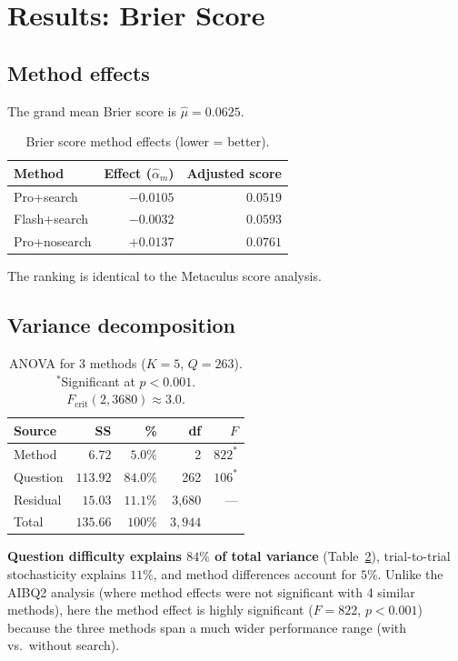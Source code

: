 \documentclass[11pt]{article}
\begin{document}
\section{Results: Brier Score}

\subsection{Method effects}

The grand mean Brier score is $\hat{\mu} = 0.0625$.

\begin{table}[h]
\centering
\begin{tabular}{lrr}
\toprule
Method & Effect ($\hat{\alpha}_m$) & Adjusted score \\
\midrule
Pro+search      & $-0.0105$ & $0.0519$ \\
Flash+search    & $-0.0032$ & $0.0593$ \\
Pro+nosearch    & $+0.0137$ & $0.0761$ \\
\bottomrule
\end{tabular}
\caption{Brier score method effects (lower = better).}
\label{tab:brier_effects}
\end{table}

The ranking is identical to the Metaculus score analysis.

\subsection{Variance decomposition}

\begin{table}[h]
\centering
\begin{tabular}{lrrrr}
\toprule
Source & SS & \% & df & $F$ \\
\midrule
Method   & $6.72$  & $5.0\%$  & 2    & $822^*$ \\
Question & $113.92$ & $84.0\%$ & 262  & $106^*$ \\
Residual & $15.03$ & $11.1\%$ & 3{,}680 & --- \\
\midrule
Total    & $135.66$ & $100\%$ & $3{,}944$ & \\
\bottomrule
\end{tabular}
\caption{ANOVA for 3 methods ($K=5$, $Q=263$).
  $^*$Significant at $p < 0.001$.
  $F_{\mathrm{crit}}(2, 3680) \approx 3.0$.}
\label{tab:brier_anova}
\end{table}

\textbf{Question difficulty explains $84\%$ of total variance}
(Table~\ref{tab:brier_anova}), trial-to-trial stochasticity explains
$11\%$, and method differences account for $5\%$.  Unlike the AIBQ2
analysis (where method effects were not significant with 4 similar methods),
here the method effect is highly significant ($F = 822$, $p < 0.001$)
because the three methods span a much wider performance range
(with vs.\ without search).
\end{document}
